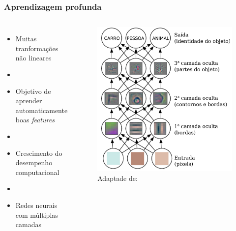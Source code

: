 \documentclass[10pt]{beamer}
\begin{document}
\begin{frame}[fragile]
  \frametitle{Aprendizagem profunda}

  \begin{columns}[onlytextwidth]
      
      \begin{itemize}
        \item[-] Muitas tranformações não lineares
        \item[\ ] \ 
        \item[-] Objetivo de aprender automaticamente boas \textit{features}
        \item[\ ] \ 
        \item[-] Crescimento do desempenho computacional
        \item[\ ] \ 
        \item[-] Redes neurais com múltiplas camadas
      \end{itemize}

    \column{0.55\textwidth}
      
      \begin{figure}
      \begin{center}
        \includegraphics[scale=0.24]{img/aprendendodeep2.pdf}
      \end{center}
      \caption{Adaptade de: }
    \end{figure}
       

  \end{columns}
  

\end{frame}
\end{document}

